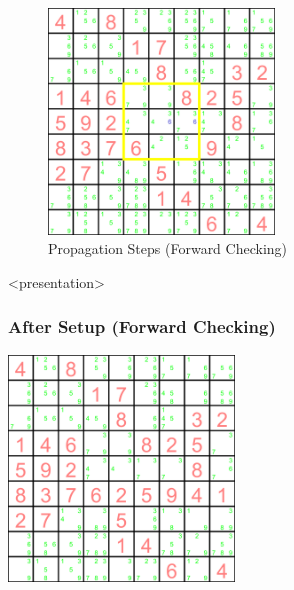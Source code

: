 \begin{frame}
{\vfill
{}
}
\end{frame}

\begin{figure}[ht]
\caption{\label{sudoku:propagationfc}Propagation Steps (Forward Checking)}
\begin{center}
\includegraphics[width=6cm]{../sudoku/FC/frame24}
\end{center}
\end{figure}

\begin{frame}<presentation>
\frametitle{After Setup (Forward Checking)}
\includegraphics[width=6cm]{../sudoku/FC/frame29}
\end{frame}

